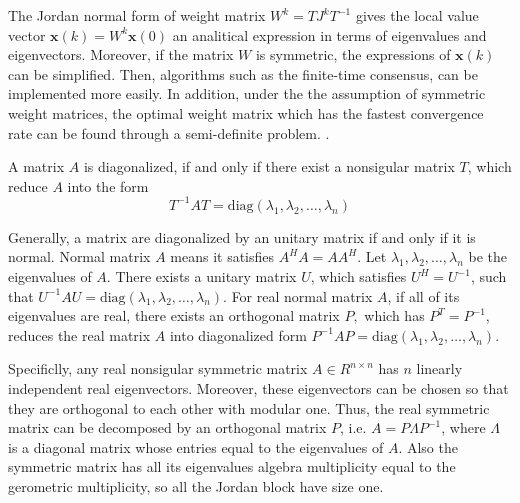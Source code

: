 The Jordan normal form of weight matrix $W^{k}=TJ^{k}T^{-1}$ gives
the local value vector $\mathbf{x}\left(k\right)=W^{k}\mathbf{x}\left(0\right)$
an analitical expression in terms of eigenvalues and eigenvectors.
Moreover, if the matrix $W$ is symmetric, the expressions of $\mathbf{x}\left(k\right)$
can be simplified. Then, algorithms such as the finite-time consensus,
can be implemented more easily. In addition, under the the assumption
of symmetric weight matrices, the optimal weight matrix which has
the fastest convergence rate can be found through a semi-definite
problem. \cite{Li2010}. 
\begin{defn}
A matrix $A$ is diagonalized, if and only if there exist a nonsigular
matrix $T$, which reduce $A$ into the form 
\[
T^{-1}AT=\mbox{diag}\left(\lambda_{1},\lambda_{2},\ldots,\lambda_{n}\right)
\]

\end{defn}
Generally, a matrix are diagonalized by an unitary matrix if and only
if it is normal. Normal matrix $A$ means it satisfies $A^{H}A=AA^{H}$.
Let $\lambda_{1},\lambda_{2},\ldots,\lambda_{n}$ be the eigenvalues
of $A$. There exists a unitary matrix $U$, which satisfies $U^{H}=U^{-1}$,
such that $U^{-1}AU=\mbox{diag}\left(\lambda_{1},\lambda_{2},\ldots,\lambda_{n}\right)$.
For real normal matrix $A$, if all of its eigenvalues are real, there
exists an orthogonal matrix $P,$ which has $P^{T}=P^{-1}$, reduces
the real matrix $A$ into diagonalized form $P^{-1}AP=\mbox{diag}\left(\lambda_{1},\lambda_{2},\ldots,\lambda_{n}\right)$. 

Specificlly, any real nonsigular symmetric matrix $A\in R^{n\times n}$
has $n$ linearly independent real eigenvectors. Moreover, these eigenvectors
can be chosen so that they are orthogonal to each other with modular
one. Thus, the real symmetric matrix can be decomposed by an orthogonal
matrix $P$, i.e. $A=P\Lambda P^{-1}$, where $\Lambda$ is a diagonal
matrix whose entries equal to the eigenvalues of $A$. Also the symmetric
matrix has all its eigenvalues algebra multiplicity equal to the gerometric
multiplicity, so all the Jordan block have size one.
